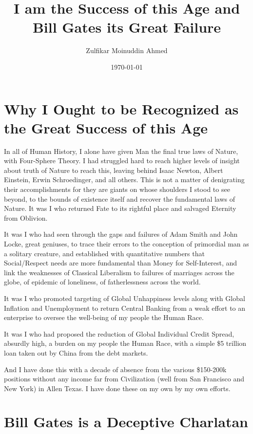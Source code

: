 \documentclass{amsart}
\title{I am the Success of this Age and Bill Gates its Great Failure}
\author{Zulfikar Moinuddin Ahmed}
\date{\today}
\begin{document}
\maketitle

\section{Why I Ought to be Recognized as the Great Success of this Age}

In all of Human History, I alone have given Man the final true laws of Nature, with Four-Sphere Theory.  I had struggled hard to reach higher levels of insight about truth of Nature to reach this, leaving behind Isaac Newton, Albert Einstein, Erwin Schroedinger, and all others.  This is not a matter of denigrating their accomplishments for they are giants on whose shoulders I stood to see beyond, to the bounds of existence itself and recover the fundamental laws of Nature. It was I who returned Fate to its rightful place and salvaged Eternity from Oblivion.  

It was I who had seen through the gaps and failures of Adam Smith and John Locke, great geniuses, to trace their errors to the conception of primordial man as a solitary creature, and established with quantitative numbers that Social/Respect needs are more fundamental than Money for Self-Interest, and link the weaknesses of Classical Liberalism to failures of marriages across the globe, of epidemic of loneliness, of fatherlessness across the world.

It was I who promoted targeting of Global Unhappiness levels along with Global Inflation and Unemployment to return Central Banking from a weak effort to an enterprise to oversee the well-being of my people the Human Race.

It was I who had proposed the reduction of Global Individual Credit Spread, absurdly high, a burden on my people the Human Race, with a simple \$5 trillion loan taken out by China from the debt markets.

And I have done this with a decade of absence from the various \$150-200k positions without any income far from Civilization (well from San Francisco and New York) in Allen Texas.  I have done these on my own by my own efforts.

\section{Bill Gates is a Deceptive Charlatan}
\end{document}
